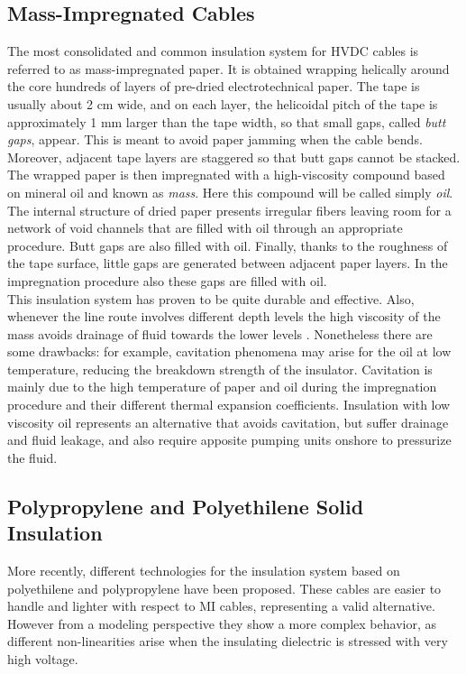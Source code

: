 \documentclass[11pt,a4paper]{article}
\begin{document}
\subsection{Mass-Impregnated Cables}
The most consolidated and common insulation system for HVDC cables is referred to as mass-impregnated paper. It is obtained wrapping helically around the core hundreds of layers of pre-dried electrotechnical paper. The tape is usually about 2 cm wide, and on each layer, the helicoidal pitch of the tape is approximately 1 mm larger than the tape width, so that small gaps, called \textit{butt gaps}, appear. This is meant to avoid paper jamming when the cable bends. Moreover, adjacent tape layers are staggered so that butt gaps cannot be stacked.\\
The wrapped paper is then impregnated with a high-viscosity compound based on mineral oil and known as \textit{mass}. Here this compound will be called simply \textit{oil}. The internal structure of dried paper presents irregular fibers leaving room for a network of void channels that are filled with oil through an appropriate procedure. Butt gaps are also filled with oil. Finally, thanks to the roughness of the tape surface, little gaps are generated between adjacent paper layers. In the impregnation procedure also these gaps are filled with oil.\\
This insulation system has proven to be quite durable and effective. Also, whenever the line route involves different depth levels the high viscosity of the mass avoids drainage of fluid towards the lower levels \cite{ancient_and_modern_cables}. Nonetheless there are some drawbacks: for example, cavitation phenomena may arise for the oil at low temperature, reducing the breakdown strength of the insulator. Cavitation is mainly due to the high temperature of paper and oil during the impregnation procedure and their different thermal expansion coefficients. Insulation with low viscosity oil represents an alternative that avoids cavitation, but suffer drainage and fluid leakage, and also require apposite pumping units onshore to pressurize the fluid.
\subsection{Polypropylene and Polyethilene Solid Insulation}
More recently, different technologies for the insulation system based on polyethilene and polypropylene have been proposed. These cables are easier to handle and lighter with respect to MI cables, representing a valid alternative. However from a modeling perspective they show a more complex behavior, as different non-linearities arise when the insulating dielectric is stressed with very high voltage.
\end{document}
